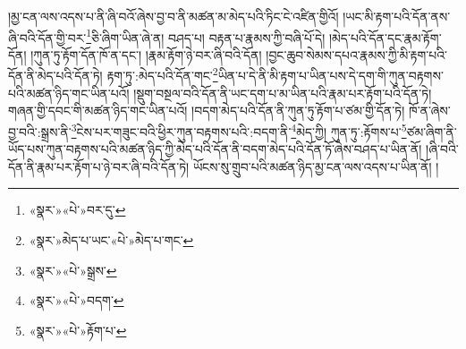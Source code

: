 །མྱ་ངན་ལས་འདས་པ་ནི་ཞི་བའོ་ཞེས་བྱ་བ་ནི་མཚན་མ་མེད་པའི་ཏིང་ངེ་འཛིན་གྱིའོ། །ཡང་མི་རྟག་པའི་དོན་ནས་ཞི་བའི་དོན་གྱི་བར་\footnote{«སྣར་»«པེ་»བར་དུ་}ཅི་ཞིག་ཡིན་ཞེ་ན། བཤད་པ། བརྟན་པ་རྣམས་ཀྱི་བཞི་པོ་དེ། །མེད་པའི་དོན་དང་རྣམ་རྟོག་དོན། །ཀུན་ཏུ་རྟོག་དོན་ཁོ་ན་དང་། །རྣམ་རྟོག་ཉེ་བར་ཞི་བའི་དོན། །བྱང་ཆུབ་སེམས་དཔའ་རྣམས་ཀྱི་མི་རྟག་པའི་དོན་ནི་མེད་པའི་དོན་ཏེ། རྟག་ཏུ་:མེད་པའི་དོན་གང་\footnote{«སྣར་»མེད་པ་ཡང་«པེ་»མེད་པ་གང་}ཡིན་པ་དེ་ནི་མི་རྟག་པ་ཡིན་པས་དེ་དག་གི་ཀུན་བརྟགས་པའི་མཚན་ཉིད་གང་ཡིན་པའོ། །སྡུག་བསྔལ་བའི་དོན་ནི་ཡང་དག་པ་མ་ཡིན་པའི་རྣམ་པར་རྟོག་པའི་དོན་ཏེ། གཞན་གྱི་དབང་གི་མཚན་ཉིད་གང་ཡིན་པའོ། །བདག་མེད་པའི་དོན་ནི་ཀུན་ཏུ་རྟོག་པ་ཙམ་གྱི་དོན་ཏེ། ཁོ་ན་ཞེས་བྱ་བའི་:སྒྲས་ནི་\footnote{«སྣར་»«པེ་»སྒྲས་}ངེས་པར་གཟུང་བའི་ཕྱིར་ཀུན་བརྟགས་པའི་:བདག་ནི་\footnote{«སྣར་»«པེ་»བདག་}མེད་ཀྱི། ཀུན་ཏུ་:རྟོགས་པ་\footnote{«སྣར་»«པེ་»རྟོག་པ་}ཙམ་ཞིག་ནི་ཡོད་པས་ཀུན་བརྟགས་པའི་མཚན་ཉིད་ཀྱི་མེད་པའི་དོན་ནི་བདག་མེད་པའི་དོན་ཏོ་ཞེས་བཤད་པ་ཡིན་ནོ། །ཞི་བའི་དོན་ནི་རྣམ་པར་རྟོག་པ་ཉེ་བར་ཞི་བའི་དོན་ཏེ། ཡོངས་སུ་གྲུབ་པའི་མཚན་ཉིད་མྱ་ངན་ལས་འདས་པ་ཡིན་ནོ། །
